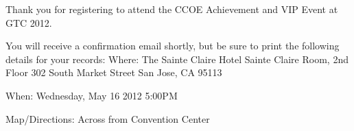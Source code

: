 Thank you for registering to attend the CCOE Achievement and VIP Event at GTC 2012.

You will receive a confirmation email shortly, but be sure to print the following details for your records:
Where: 	The Sainte Claire Hotel
Sainte Claire Room, 2nd Floor
302 South Market Street
San Jose, CA 95113
 
When: 	Wednesday, May 16 2012
5:00PM
 
Map/Directions: 	Across from Convention Center

